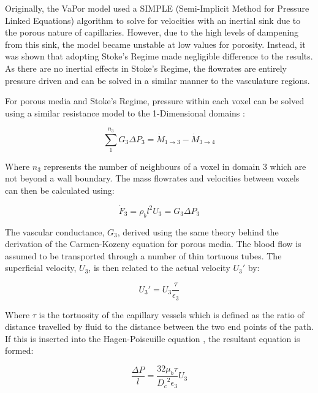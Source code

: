 \documentclass[11pt,english,a4paper,twoside,openright]{report}
\begin{document}
{{{{{{{{Originally, the VaPor model used a SIMPLE (Semi-Implicit Method for Pressure Linked Equations) algorithm \cite{ferziger1997computational} to solve for velocities with an inertial sink due to the porous nature of capillaries. However, due to the high levels of dampening from this sink, the model became unstable at low values for porosity. Instead, it was shown that adopting Stoke's Regime \cite{holdich2002fundamentals} made negligible difference to the results. As there are no inertial effects in Stoke's Regime, the flowrates are entirely pressure driven and can be solved in a similar manner to the vasculature regions.

For porous media and Stoke's Regime, pressure within each voxel can be solved using a similar resistance model to the 1-Dimensional domains \cite{holdich2002fundamentals}: 

\begin{equation}
\label{Eq:3DFlowrate}
\sum_1^{n_{3}} G_{3}\Delta P_{3} = \dot{M}_{1\rightarrow3}-\dot{M}_{3\rightarrow4}
\end{equation}

Where $n_{3}$ represents the number of neighbours of a voxel in domain 3 which are not beyond a wall boundary. The mass flowrates and velocities between voxels can then be calculated using:

\begin{equation}
\label{Eq:3DVelocities}
\dot{F}_{3}=\rho_{b}l^{2}U_{3} = G_{3}\Delta P_{3}
\end{equation}

The vascular conductance, $G_{3}$, derived using the same theory behind the derivation of the Carmen-Kozeny equation for porous media. The blood flow is assumed to be transported through a number of thin tortuous tubes. The superficial velocity, $U_{3}$, is then related to the actual velocity $U_{3}'$ by:

\begin{equation}
U_{3}' = U_{3}\frac{\tau}{\epsilon_{3}}
\end{equation}

Where $\tau$ is the tortuosity of the capillary vessels which is defined as the ratio of distance travelled by fluid to the distance between the two end points of the path. If this is inserted into the Hagen-Poiseuille equation \cite{white2003fluid}, the resultant equation is formed:

\begin{equation}
\frac{\Delta P}{l} = \frac{32\mu_{b}\tau}{{D_{c}}^{2}\epsilon_{3}}U_{3}
\end{equation}

}}}}}}}}
\end{document}
